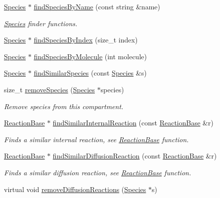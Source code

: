 \begin{DoxyCompactItemize}
\hyperlink{classSpecies}{Species} $\ast$ \hyperlink{classCompartment_a848f62b2bb65399b8d403f47e4519891}{find\+Species\+By\+Name} (const string \&name)
\begin{DoxyCompactList}\small\item\em \hyperlink{classSpecies}{Species} finder functions. \end{DoxyCompactList}\item 
\hyperlink{classSpecies}{Species} $\ast$ \hyperlink{classCompartment_a359656825453c3e0d207c9214e7458a2}{find\+Species\+By\+Index} (size\+\_\+t index)
\item 
\hyperlink{classSpecies}{Species} $\ast$ \hyperlink{classCompartment_aa6fa444425eb298857d4d90838af5bb0}{find\+Species\+By\+Molecule} (int molecule)
\item 
\hyperlink{classSpecies}{Species} $\ast$ \hyperlink{classCompartment_a34f6affea6b6820e8b6e4097f1cec7d1}{find\+Similar\+Species} (const \hyperlink{classSpecies}{Species} \&s)
\item 
size\+\_\+t \hyperlink{classCompartment_a84f65b66e75e08aac1de34b80b169a8f}{remove\+Species} (\hyperlink{classSpecies}{Species} $\ast$species)
\begin{DoxyCompactList}\small\item\em Remove species from this compartment. \end{DoxyCompactList}\item 
\hyperlink{classReactionBase}{Reaction\+Base} $\ast$ \hyperlink{classCompartment_a3b3b72cfbd524cc951bf10984a045678}{find\+Similar\+Internal\+Reaction} (const \hyperlink{classReactionBase}{Reaction\+Base} \&r)
\begin{DoxyCompactList}\small\item\em Finds a similar internal reaction, see \hyperlink{classReactionBase}{Reaction\+Base} function. \end{DoxyCompactList}\item 
\hyperlink{classReactionBase}{Reaction\+Base} $\ast$ \hyperlink{classCompartment_ade2b829093c85d8f330265bdd7a46af9}{find\+Similar\+Diffusion\+Reaction} (const \hyperlink{classReactionBase}{Reaction\+Base} \&r)
\begin{DoxyCompactList}\small\item\em Finds a similar diffusion reaction, see \hyperlink{classReactionBase}{Reaction\+Base} function. \end{DoxyCompactList}\item 
virtual void \hyperlink{classCompartment_a4cc28cd9d15bb882ec89d8bc5cdaea43}{remove\+Diffusion\+Reactions} (\hyperlink{classSpecies}{Species} $\ast$s)

\end{DoxyCompactItemize}
